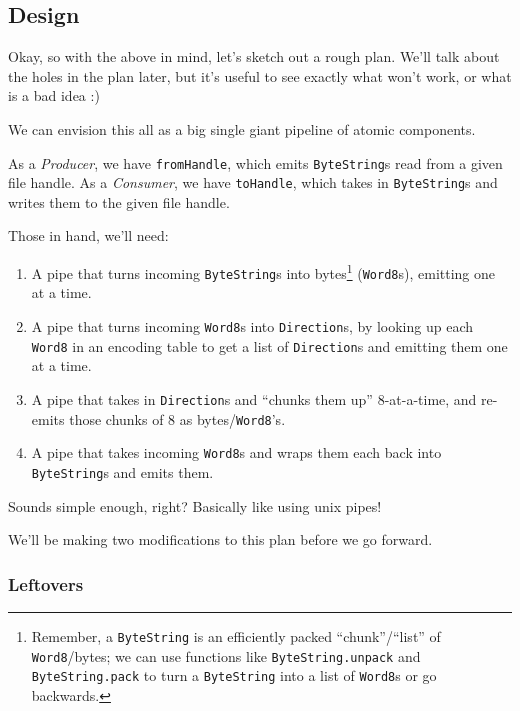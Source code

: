 \documentclass[]{article}
\begin{document}
\hypertarget{design}{%
\subsection{Design}\label{design}}

Okay, so with the above in mind, let's sketch out a rough plan. We'll talk about
the holes in the plan later, but it's useful to see exactly what won't work, or
what is a bad idea :)

We can envision this all as a big single giant pipeline of atomic components.

As a \emph{Producer}, we have \texttt{fromHandle}, which emits
\texttt{ByteString}s read from a given file handle. As a \emph{Consumer}, we
have \texttt{toHandle}, which takes in \texttt{ByteString}s and writes them to
the given file handle.

Those in hand, we'll need:

\begin{enumerate}
\def\labelenumi{\arabic{enumi}.}
\tightlist
\item
  A pipe that turns incoming \texttt{ByteString}s into bytes\footnote{Remember,
    a \texttt{ByteString} is an efficiently packed ``chunk''/``list'' of
    \texttt{Word8}/bytes; we can use functions like \texttt{ByteString.unpack}
    and \texttt{ByteString.pack} to turn a \texttt{ByteString} into a list of
    \texttt{Word8}s or go backwards.} (\texttt{Word8}s), emitting one at a time.
\item
  A pipe that turns incoming \texttt{Word8}s into \texttt{Direction}s, by
  looking up each \texttt{Word8} in an encoding table to get a list of
  \texttt{Direction}s and emitting them one at a time.
\item
  A pipe that takes in \texttt{Direction}s and ``chunks them up'' 8-at-a-time,
  and re-emits those chunks of 8 as bytes/\texttt{Word8}'s.
\item
  A pipe that takes incoming \texttt{Word8}s and wraps them each back into
  \texttt{ByteString}s and emits them.
\end{enumerate}

Sounds simple enough, right? Basically like using unix pipes!

We'll be making two modifications to this plan before we go forward.

\hypertarget{leftovers}{%
\subsubsection{Leftovers}\label{leftovers}}
\end{document}

